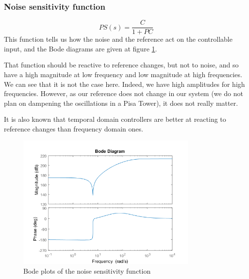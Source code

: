 \subsubsection{Noise sensitivity function}
$$
PS(s) = \dfrac{C}{1 + PC}
$$
This function tells us how the noise and the reference act on the controllable input, and the Bode diagrams are given at figure \ref{fig:noise-sensitivity}.\par
That function should be reactive to reference changes, but not to noise, and so have a high magnitude at low frequency and low magnitude at high frequencies. We can see that it is not the case here. Indeed, we have high amplitudes for high frequencies. However, as our reference does not change in our system (we do not plan on dampening the oscillations in a Pisa Tower), it does not really matter.\par
It is also known that temporal domain controllers are better at reacting to reference changes than frequency domain ones.
\begin{figure}[H]
    \centering
    \includegraphics[width=0.8\textwidth]{resources/png/noise-sensitivity.png}
    \caption{Bode plots of the noise sensitivity function}
    \label{fig:noise-sensitivity}
\end{figure}

